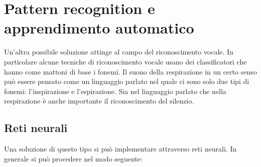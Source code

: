 \section{Pattern recognition e apprendimento automatico}
Un'altra possibile soluzione attinge al campo del riconoscimento vocale. 
In particolare alcune tecniche di riconoscimento vocale usano dei classificatori che hanno come mattoni di base i fonemi. 
Il suono della respirazione in un certo senso pu\`o essere pensato come un linguaggio parlato nel quale ci sono solo due tipi di fonemi: l'inspirazione e l'espirazione. 
Sia nel linguaggio parlato che nella respirazione \`e anche importante il riconoscimento del silenzio.
  
\subsection{Reti neurali}
Una soluzione di questo tipo si pu\`o implementare attraverso reti neurali. In generale si pu\`o procedere nel modo seguente:
